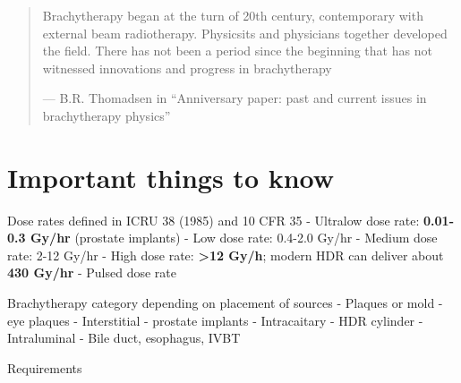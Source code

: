 \documentclass[]{book}
\theoremstyle{definition}
\theoremstyle{definition}
\theoremstyle{definition}
\theoremstyle{remark}
\begin{document}
\begin{quote}
Brachytherapy began at the turn of 20th century, contemporary with
external beam radiotherapy. Physicsits and physicians together developed
the field. There has not been a period since the beginning that has not
witnessed innovations and progress in brachytherapy

--- B.R. Thomadsen in ``Anniversary paper: past and current issues in
brachytherapy physics''
\end{quote}

\section{Important things to know}\label{important-things-to-know}

Dose rates defined in ICRU 38 (1985) and 10 CFR 35 - Ultralow dose rate:
\textbf{0.01-0.3 Gy/hr} (prostate implants) - Low dose rate: 0.4-2.0
Gy/hr - Medium dose rate: 2-12 Gy/hr - High dose rate:
\textbf{\textgreater{}12 Gy/h}; modern HDR can deliver about \textbf{430
Gy/hr} - Pulsed dose rate

Brachytherapy category depending on placement of sources - Plaques or
mold - eye plaques - Interstitial - prostate implants - Intracaitary -
HDR cylinder - Intraluminal - Bile duct, esophagus, IVBT

Requirements
\end{document}
